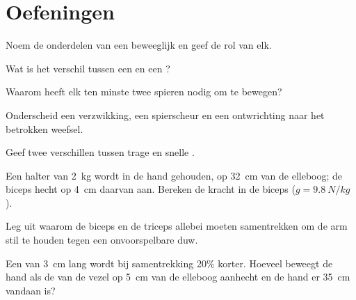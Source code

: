 \section{Oefeningen}

\begin{exercise}[$\star$]\label{exo:g10:muscles-and-joints:1}
Noem de onderdelen van een beweeglijk  en geef de rol van elk.
\end{exercise}

\begin{exercise}[$\star$]\label{exo:g10:muscles-and-joints:2}
Wat is het verschil tussen een  en een ?
\end{exercise}

\begin{exercise}[$\star$]\label{exo:g10:muscles-and-joints:3}
Waarom heeft elk  ten minste twee spieren nodig om te bewegen?
\end{exercise}

\begin{exercise}[$\star$]\label{exo:g10:muscles-and-joints:4}
Onderscheid een verzwikking, een spierscheur en een ontwrichting naar het
betrokken weefsel.
\end{exercise}

\begin{exercise}[$\star$]\label{exo:g10:muscles-and-joints:5}
Geef twee verschillen tussen trage en snelle .
\end{exercise}

\begin{exercise}[$\star\star$]\label{exo:g10:muscles-and-joints:6}
Een halter van \qty{2}{kg} wordt in de hand gehouden, op \qty{32}{cm} van
de elleboog; de biceps hecht op \qty{4}{cm} daarvan aan. Bereken de
kracht in de biceps ($g = \qty{9.8}{N/kg}$).
\end{exercise}

\begin{exercise}[$\star\star$]\label{exo:g10:muscles-and-joints:7}
Leg uit waarom de biceps en de triceps allebei moeten samentrekken om de
arm stil te houden tegen een onvoorspelbare duw.
\end{exercise}

\begin{exercise}[$\star\star$]\label{exo:g10:muscles-and-joints:8}
Een  van \qty{3}{cm} lang wordt bij samentrekking 20\% korter.
Hoeveel beweegt de hand als de  van de vezel op \qty{5}{cm} van de
elleboog aanhecht en de hand er \qty{35}{cm} vandaan is?
\end{exercise}

